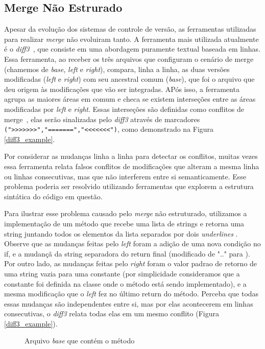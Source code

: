 \subsection{Merge Não Estrurado}
Apesar da evolução dos sistemas de controle de versão, as ferramentas utilizadas para realizar
\emph{merge} não evoluiram tanto. A ferramenta mais utilizada atualmente é o \emph{diff3}~\cite{mens02}, que consiste em uma
abordagem puramente textual baseada em linhas. Essa ferramenta, ao receber os três arquivos que configuram o cenário de merge
(chamemos de \emph{base}, \emph{left} e \emph{right}), compara, linha a linha, as duas versões modificadas
(\emph{left} e \emph{right}) com seu ancestral comum (\emph{base}), que foi o arquivo que deu origem às modificações
que vão ser integradas. APós isso, a ferramenta agrupa as maiores áreas em comum e checa se existem interseções entre as
áreas modificadas por \emph{left} e \emph{right}. Essas interseções são definidas como conflitos de merge~\cite{khan07},
elas serão sinalizadas pelo \emph{diff3} através de marcadores \verb|(">>>>>>>","=======","<<<<<<<")|, como demonstrado na
Figura \ref{diff3_example}.

Por considerar as mudanças linha a linha para detectar os conflitos, muitas vezes essa ferramenta relata falsos conflitos
de modificações que alteram a mesma linha ou linhas consecutivas, mas que não interferem entre si semanticamente.
Esse problema poderia ser resolvido utilizando ferramentas que explorem a estrutura sintática do código em questão.

Para ilustrar esse problema causado pelo \emph{merge} não estruturado, utilizamos a implementação de um método
 que
recebe uma lista de strings e retorna uma string juntando todos os elementos da lista separados por dois
\emph{underlines} . Observe que as mudanças feitas pelo \emph{left} foram a adição de uma nova
condição no if, e a mudançã da string separadora do return final (modificado de ".." para ). Por outro lado,
as mudanças feitas pelo \emph{right} foram o valor padrao de retorno de uma string vazia para uma constante (por simplicidade
consideramos que a constante foi definida na classe onde o método está sendo implementado), e a mesma
modificação que o \emph{left} fez no último return do método. Perceba que todas essas mudanças são independentes entre si,
mas por elas acontecerem em linhas consecutivas, o \emph{diff3} relata todas elas em um mesmo conflito (Figura
\ref{diff3_example}).

\begin{figure}[ht]
	\begin{center}
		
		\caption{Arquivo \emph{base} que contém o método }\label{base_example}
	\end{center}
\end{figure}

